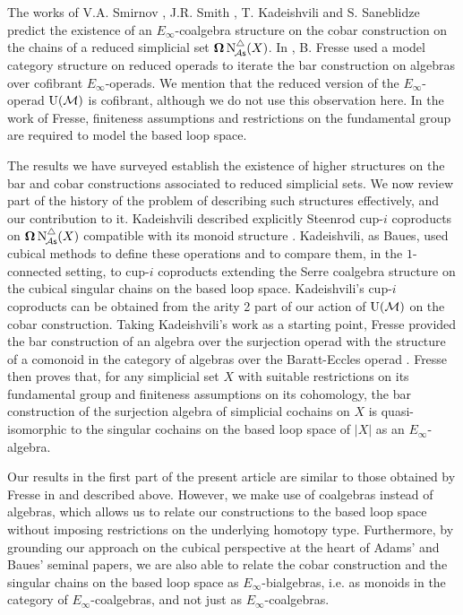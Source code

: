 The works of V.A. Smirnov \cite{smirnov1990iterated}, J.R. Smith \cite{smith1994cobar, smith2000operads}, T. Kadeishvili and S. Saneblidze \cite{kadeishvili1998iterating} predict the existence of an $E_\infty$-coalgebra structure on the cobar construction on the chains of a reduced simplicial set $\operatorname{\mathbf{\Omega}} \operatorname{N^{\triangle}_{\!{\mathcal{A}\mathsf{s}}}}(X)$.
In \cite{fresse2010bar}, B. Fresse used a model category structure on reduced operads \cite{berger2003modelcategory, hinich1997homologicalalgebra} to iterate the bar construction on algebras over cofibrant $E_\infty$-operads.
We mention that the reduced version of the $E_\infty$-operad ${\operatorname{U}(\mathcal{M})}$ is cofibrant, although we do not use this observation here.
In the work of Fresse, finiteness assumptions and restrictions on the fundamental group are required to model the based loop space.

The results we have surveyed establish the existence of higher structures on the bar and cobar constructions associated to reduced simplicial sets.
We now review part of the history of the problem of describing such structures effectively, and our contribution to it.
Kadeishvili described explicitly Steenrod cup-$i$ coproducts on $\operatorname{\mathbf{\Omega}} \operatorname{N^{\triangle}_{\!{\mathcal{A}\mathsf{s}}}}(X)$ compatible with its monoid structure \cite{kadeishvili1999coproducts, kadeishvili2003cupi}.
Kadeishvili, as Baues, used cubical methods to define these operations and to compare them, in the $1$-connected setting, to cup-$i$ coproducts extending the Serre coalgebra structure on the cubical singular chains on the based loop space.
Kadeishvili's cup-$i$ coproducts can be obtained from the arity 2 part of our action of ${\operatorname{U}(\mathcal{M})}$ on the cobar construction.
Taking Kadeishvili's work as a starting point, Fresse provided the bar construction of an algebra over the surjection operad with the structure of a comonoid in the category of algebras over the Baratt-Eccles operad \cite{fresse2003hopf}.
Fresse then proves that, for any simplicial set $X$ with suitable restrictions on its fundamental group and finiteness assumptions on its cohomology, the bar construction of the surjection algebra of simplicial cochains on $X$ is quasi-isomorphic to the singular cochains on the based loop space of $|X|$ as an $E_{\infty}$-algebra.

Our results in the first part of the present article are similar to those obtained by Fresse in \cite{fresse2003hopf} and described above.
However, we make use of coalgebras instead of algebras, which allows us to relate our constructions to the based loop space without imposing restrictions on the underlying homotopy type.
Furthermore, by grounding our approach on the cubical perspective at the heart of Adams' and Baues' seminal papers, we are also able to relate the cobar construction and the singular chains on the based loop space as $E_{\infty}$-bialgebras, i.e. as monoids in the category of $E_{\infty}$-coalgebras, and not just as $E_{\infty}$-coalgebras.

